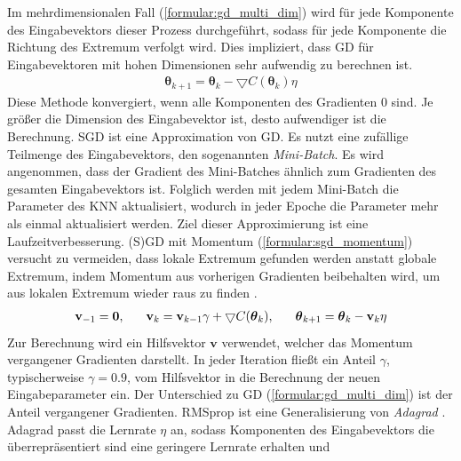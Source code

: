 Im mehrdimensionalen Fall (\ref{formular:gd_multi_dim}) wird für jede Komponente des Eingabevektors dieser Prozess durchgeführt, sodass für jede Komponente
die Richtung des Extremum verfolgt wird.
Dies impliziert, dass GD für Eingabevektoren mit hohen Dimensionen sehr aufwendig zu berechnen ist.
\begin{align}
    \label{formular:gd_multi_dim}
    \boldsymbol\theta_{k+1} = \boldsymbol\theta_k - \bigtriangledown C(\boldsymbol\theta_k)\eta
\end{align}
Diese Methode konvergiert, wenn alle Komponenten des Gradienten 0 sind.
Je größer die Dimension des Eingabevektor ist, desto aufwendiger ist die Berechnung.
\newline
\newline
SGD ist eine Approximation von GD. Es nutzt eine zufällige Teilmenge des Eingabevektors, den sogenannten \textit{Mini-Batch}.
Es wird angenommen, dass der Gradient des Mini-Batches ähnlich zum Gradienten des gesamten Eingabevektors ist.
Folglich werden mit jedem Mini-Batch die Parameter des KNN aktualisiert, wodurch in jeder Epoche die Parameter mehr als einmal aktualisiert werden.
Ziel dieser Approximierung ist eine Laufzeitverbesserung.
\newline
\newline
(S)GD mit Momentum (\ref{formular:sgd_momentum}) versucht zu vermeiden, dass lokale Extremum gefunden werden anstatt globale Extremum, indem Momentum aus
vorherigen Gradienten beibehalten wird, um aus lokalen Extremum wieder raus zu finden \cite{higham2019deep}.
\begin{align}
    \label{formular:sgd_momentum}
    \textbf{v}_{-1} = \textbf{0}, \hspace{0.6cm} \textbf{v}_k = \textbf{v}_{k-1}\gamma +
    \bigtriangledown C(\boldsymbol\theta_k), \hspace{0.6cm} \boldsymbol\theta_{k+1} = \boldsymbol\theta_k - \textbf{v}_k\eta
\end{align}
Zur Berechnung wird ein Hilfsvektor $\textbf{v}$ verwendet, welcher das Momentum vergangener Gradienten darstellt.
In jeder Iteration fließt ein Anteil $\gamma$, typischerweise $\gamma=0.9$, vom Hilfsvektor in die Berechnung der neuen Eingabeparameter ein.
Der Unterschied zu GD (\ref{formular:gd_multi_dim}) ist der Anteil vergangener Gradienten.
\newline
\newline
RMSprop ist eine Generalisierung von \textit{Adagrad} \cite{mukkamala2017variants}.
Adagrad passt die Lernrate $\eta$ an, sodass Komponenten des Eingabevektors die überrepräsentiert sind eine geringere Lernrate erhalten und
